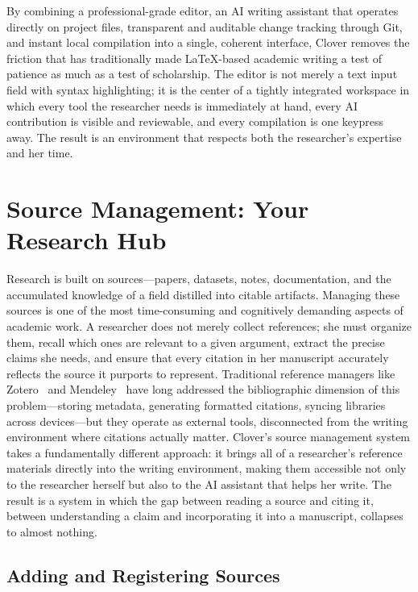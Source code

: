 \documentclass[a4paper,11pt]{article}
\begin{document}
By combining a professional-grade editor, an AI writing assistant that operates directly on project files, transparent and auditable change tracking through Git, and instant local compilation into a single, coherent interface, Clover removes the friction that has traditionally made \LaTeX{}-based academic writing a test of patience as much as a test of scholarship. The editor is not merely a text input field with syntax highlighting; it is the center of a tightly integrated workspace in which every tool the researcher needs is immediately at hand, every AI contribution is visible and reviewable, and every compilation is one keypress away. The result is an environment that respects both the researcher's expertise and her time.

\newpage

\section{Source Management: Your Research Hub}
\label{sec:sources}

Research is built on sources---papers, datasets, notes, documentation, and the accumulated knowledge of a field distilled into citable artifacts. Managing these sources is one of the most time-consuming and cognitively demanding aspects of academic work. A researcher does not merely collect references; she must organize them, recall which ones are relevant to a given argument, extract the precise claims she needs, and ensure that every citation in her manuscript accurately reflects the source it purports to represent. Traditional reference managers like Zotero~\cite{Zotero} and Mendeley~\cite{Mendeley} have long addressed the bibliographic dimension of this problem---storing metadata, generating formatted citations, syncing libraries across devices---but they operate as external tools, disconnected from the writing environment where citations actually matter. Clover's source management system takes a fundamentally different approach: it brings all of a researcher's reference materials directly into the writing environment, making them accessible not only to the researcher herself but also to the AI assistant that helps her write. The result is a system in which the gap between reading a source and citing it, between understanding a claim and incorporating it into a manuscript, collapses to almost nothing.

\subsection{Adding and Registering Sources}
\end{document}
